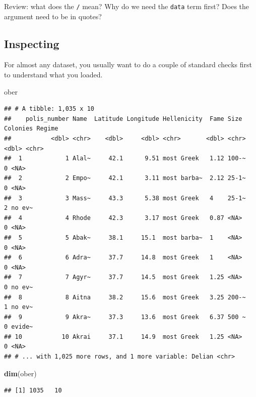 \documentclass[
]{book}
\newenvironment{Shaded}{\begin{snugshade}}{\end{snugshade}}
\newcommand{\KeywordTok}[1]{\textcolor[rgb]{0.13,0.29,0.53}{\textbf{#1}}}
\newcommand{\NormalTok}[1]{#1}
\theoremstyle{definition}
\theoremstyle{definition}
\theoremstyle{definition}
\theoremstyle{remark}
\begin{document}
Review: what does the \texttt{/} mean? Why do we need the \texttt{data} term first? Does the argument need to be in quotes?

\hypertarget{inspecting}{%
\subsection{Inspecting}\label{inspecting}}

For almost any dataset, you usually want to do a couple of standard checks first to understand what you loaded.

\begin{Shaded}
\begin{Highlighting}[]
\NormalTok{ober}
\end{Highlighting}
\end{Shaded}

\begin{verbatim}
## # A tibble: 1,035 x 10
##    polis_number Name  Latitude Longitude Hellenicity  Fame Size  Colonies Regime
##           <dbl> <chr>    <dbl>     <dbl> <chr>       <dbl> <chr>    <dbl> <chr> 
##  1            1 Alal~     42.1      9.51 most Greek   1.12 100-~        0 <NA>  
##  2            2 Empo~     42.1      3.11 most barba~  2.12 25-1~        0 <NA>  
##  3            3 Mass~     43.3      5.38 most Greek   4    25-1~        2 no ev~
##  4            4 Rhode     42.3      3.17 most Greek   0.87 <NA>         0 <NA>  
##  5            5 Abak~     38.1     15.1  most barba~  1    <NA>         0 <NA>  
##  6            6 Adra~     37.7     14.8  most Greek   1    <NA>         0 <NA>  
##  7            7 Agyr~     37.7     14.5  most Greek   1.25 <NA>         0 no ev~
##  8            8 Aitna     38.2     15.6  most Greek   3.25 200-~        1 no ev~
##  9            9 Akra~     37.3     13.6  most Greek   6.37 500 ~        0 evide~
## 10           10 Akrai     37.1     14.9  most Greek   1.25 <NA>         0 <NA>  
## # ... with 1,025 more rows, and 1 more variable: Delian <chr>
\end{verbatim}

\begin{Shaded}
\begin{Highlighting}[]
\KeywordTok{dim}\NormalTok{(ober)}
\end{Highlighting}
\end{Shaded}

\begin{verbatim}
## [1] 1035   10
\end{verbatim}
\end{document}
